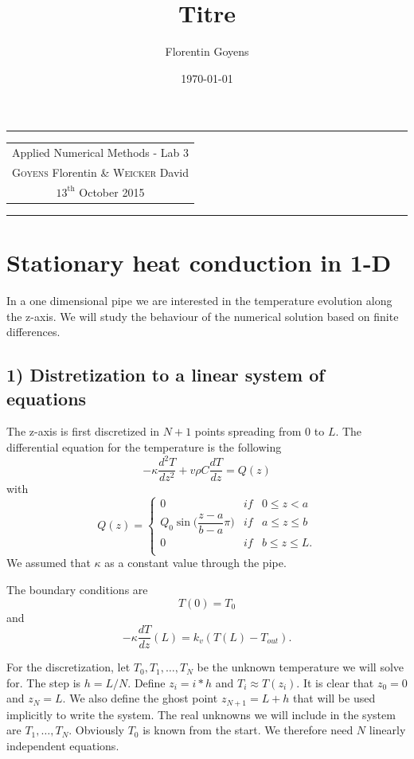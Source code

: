 \documentclass[11pt,a4paper]{report}
\title{Titre}
\author{Florentin Goyens}
\date{\today}
\begin{document}
\tabulinesep=1.2mm
\begin{center}
\hrule
\begin{tabular}{c}
\\[0.005cm]
\Large{Applied Numerical Methods - Lab 3}\\[0.3cm]
\textsc{Goyens} Florentin  \& \textsc{Weicker} David\\[0.2cm]
$\text{13}^{\text{th}}$ October 2015\\[0.2cm]
\end{tabular}
\hrule
\end{center}


\section*{Stationary heat conduction in 1-D}

In a one dimensional pipe we are interested in the temperature evolution along the z-axis.  We will study the behaviour of the numerical solution based on finite differences.



\subsection*{1) Distretization to a linear system of equations}

The z-axis is first discretized in $N+1$ points spreading from $0$ to $L$. The differential equation for the temperature is the following
$$-\kappa \dfrac{d^{2}T}{dz^{2}} +v\rho C\dfrac{dT}{dz}=Q(z)$$
with $$Q(z)= \left\{ \begin{array}{lll}
0 & if & 0\leq z <a\\
Q_{0}\sin \Big(\dfrac{z-a}{b-a}\pi \Big) & if & a \leq z \leq b\\
0 & if & b\leq z \leq L.\\
\end{array}\right.$$
We assumed that $\kappa$ as a constant value through the pipe.

The boundary conditions are
$$T(0)=T_{0}$$ and $$-\kappa \dfrac{dT}{dz}(L)=k_{v}(T(L)-T_{out}).$$

For the discretization, let $T_{0}, T_{1}, \dots, T_{N}$ be the unknown temperature we will solve for. The step is $h=L/N$. Define $z_{i}=i*h$ and $T_{i}\approx T(z_{i})$. It is clear that $z_0 =0$ and $z_N =L$. We also define the ghost point $z_{N+1}=L+h$ that will be used implicitly to write the system. The real unknowns we will include in the system are  $T_{1}, \dots, T_{N}$. Obviously $T_{0}$ is known from the start. We therefore need $N$ linearly independent equations.
\end{document}

